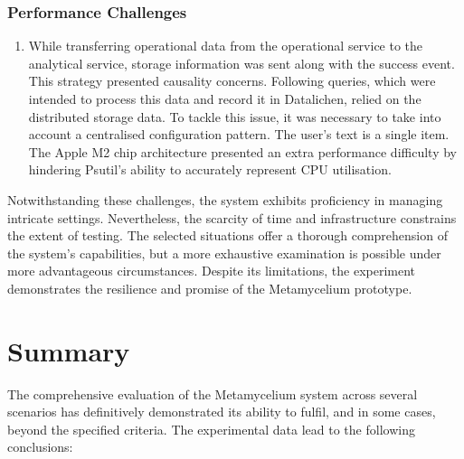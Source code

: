 \documentclass[preprint,12pt]{elsarticle}
\begin{document}
\subsubsection{Performance Challenges} 
\begin{enumerate}
    \item While transferring operational data from the operational service to the analytical service, storage information was sent along with the success event. This strategy presented causality concerns. Following queries, which were intended to process this data and record it in Datalichen, relied on the distributed storage data. To tackle this issue, it was necessary to take into account a centralised configuration pattern.
    The user's text is a single item. The Apple M2 chip architecture presented an extra performance difficulty by hindering Psutil's ability to accurately represent CPU utilisation.
\end{enumerate}

Notwithstanding these challenges, the system exhibits proficiency in managing intricate settings. Nevertheless, the scarcity of time and infrastructure constrains the extent of testing. The selected situations offer a thorough comprehension of the system's capabilities, but a more exhaustive examination is possible under more advantageous circumstances. Despite its limitations, the experiment demonstrates the resilience and promise of the Metamycelium prototype.



\section{Summary}

The comprehensive evaluation of the Metamycelium system across several scenarios has definitively demonstrated its ability to fulfil, and in some cases, beyond the specified criteria. The experimental data lead to the following conclusions:
\end{document}
